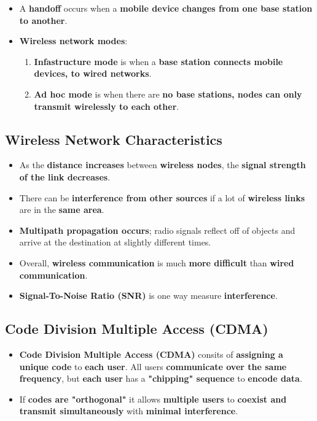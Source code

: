 \documentclass{article}
\begin{document}
\begin{itemize}
        \item A \textbf{handoff} occurs when a \textbf{mobile device changes from one base station to another}. 
        \item \textbf{Wireless network modes}:
        \begin{enumerate}
            \item \textbf{Infastructure mode} is when a \textbf{base station connects mobile devices, to wired networks}.
            \item \textbf{Ad hoc mode} is when there are \textbf{no base stations, nodes can only transmit wirelessly to each other}.
        \end{enumerate}
    \end{itemize}

    \subsection*{Wireless Network Characteristics}
    \begin{itemize}
        \item As the \textbf{distance increases} between \textbf{wireless nodes}, the \textbf{signal strength of the link decreases}.
        \item There can be \textbf{interference from other sources} if a lot of \textbf{wireless links} are in the \textbf{same area}.
        \item \textbf{Multipath propagation occurs}; radio signals reflect off of objects and arrive at the destination at slightly different times.
        \item Overall, \textbf{wireless communication} is much \textbf{more difficult} than \textbf{wired communication}.
        \item \textbf{Signal-To-Noise Ratio (SNR)} is one way measure \textbf{interference}.
    \end{itemize}

    \subsection*{Code Division Multiple Access (CDMA)}
    \begin{itemize}
        \item \textbf{Code Division Multiple Access (CDMA)} consits of \textbf{assigning a unique code} to \textbf{each user}. All users \textbf{communicate over the same frequency}, but \textbf{each user} has a \textbf{"chipping" sequence} to \textbf{encode data}.
        \item If \textbf{codes are "orthogonal"} it allows \textbf{multiple users} to \textbf{coexist and transmit simultaneously} with \textbf{minimal interference}.
    \end{itemize}
\end{document}
